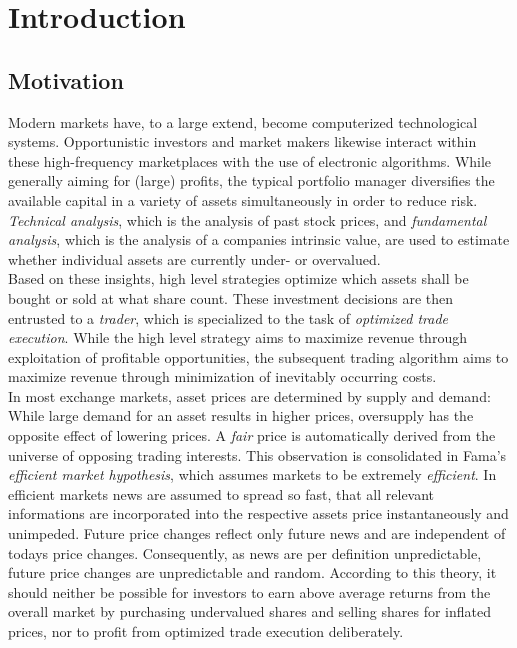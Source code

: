 \chapter{Introduction}
\label{chap:introduction}
\section{Motivation} 
\label{sec:motivation}
Modern markets have, to a large extend, become computerized technological systems. Opportunistic investors and market makers likewise interact within these high-frequency marketplaces with the use of electronic algorithms. While generally aiming for (large) profits, the typical portfolio manager diversifies the available capital in a variety of assets simultaneously in order to reduce risk. \emph{Technical analysis}, which is the analysis of past stock prices, and \emph{fundamental analysis}, which is the analysis of a companies intrinsic value, are used to estimate whether individual assets are currently under- or overvalued.\\

Based on these insights, high level strategies optimize which assets shall be bought or sold at what share count. These investment decisions are then entrusted to a \emph{trader}, which is specialized to the task of \emph{optimized trade execution}. While the high level strategy aims to maximize revenue through exploitation of profitable opportunities, the subsequent trading algorithm aims to maximize revenue through minimization of inevitably occurring costs.\\

In most exchange markets, asset prices are determined by supply and demand: While large demand for an asset results in higher prices, oversupply has the opposite effect of lowering prices. A \emph{fair} price is automatically derived from the universe of opposing trading interests. This observation is consolidated in Fama's \emph{efficient market hypothesis}\Cite{Fama70efficientcapital}, which assumes markets to be extremely \emph{efficient}. In efficient markets news are assumed to spread so fast, that all relevant informations are incorporated into the respective assets price instantaneously and unimpeded. Future price changes reflect only future news and are independent of todays price changes. Consequently, as news are per definition unpredictable, future price changes are unpredictable and random. According to this theory, it should neither be possible for investors to earn above average returns from the overall market by purchasing undervalued shares and selling shares for inflated prices, nor to profit from optimized trade execution deliberately.\\

